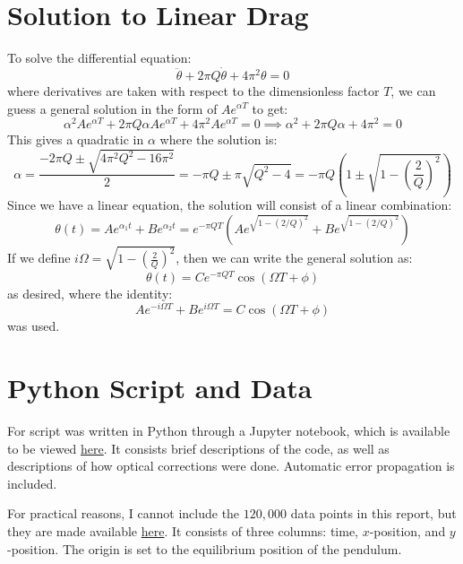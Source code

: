 \documentclass[%
 reprint,
 amsmath,amssymb
 aps,
]{revtex4-2}
\begin{document}
\section{Solution to Linear Drag}
\noindent To solve the differential equation:
\begin{equation}
    \ddot{\theta}+2\pi Q\dot{\theta}+4\pi^2\theta=0
    \label{eq:}
\end{equation}
where derivatives are taken with respect to the dimensionless factor $T$, we can guess a general solution in the form of $Ae^{\alpha T}$ to get:
\begin{equation}
    \alpha^2Ae^{\alpha T}+2\pi Q\alpha Ae^{\alpha T}+4\pi^2Ae^{\alpha T}=0 \implies \alpha^2+2\pi Q\alpha+4\pi^2 = 0
    \label{eq:}
\end{equation}
This gives a quadratic in $\alpha$ where the solution is:
\begin{equation}
    \alpha = \frac{-2\pi Q \pm \sqrt{4\pi^2Q^2-16\pi^2}}{2}= -\pi Q\pm \pi\sqrt{Q^2-4}=-\pi Q\left(1\pm\sqrt{1-\left(\frac{2}{Q}\right)^2}\right)
    \label{eq:}
\end{equation}
Since we have a linear equation, the solution will consist of a linear combination:
\begin{equation}
    \theta(t)=Ae^{\alpha_1t}+Be^{\alpha_2t}=e^{-\pi Q T}\left(Ae^{\sqrt{1-(2/Q)^2}}+Be^{\sqrt{1-(2/Q)^2}}\right)
    \label{eq:}
\end{equation}
If we define $i\Omega=\sqrt{1-\left(\frac{2}{Q}\right)^2}$, then we can write the general solution as:
\begin{equation}
    \theta(t)=Ce^{-\pi QT}\cos\left(\Omega T+\phi\right)
    \label{eq:}
\end{equation}
as desired, where the identity:
\begin{equation}
    Ae^{-i\Omega T}+Be^{i\Omega T}=C\cos\left(\Omega T+\phi\right)
    \label{eq:}
\end{equation}
was used.
\section{Python Script and Data}
For script was written in Python through a Jupyter notebook, which is available to be viewed \href{https://github.com/QiLinXue/pendulum-labs/blob/main/Data%20Analysis.ipynb}{here}. It consists brief descriptions of the code, as well as descriptions of how optical corrections were done. Automatic error propagation is included.

For practical reasons, I cannot include the $120,000$ data points in this report, but they are made available \href{https://github.com/QiLinXue/pendulum-labs/blob/main/data.txt}{here}. It consists of three columns: time, $x$-position, and $y$-position. The origin is set to the equilibrium position of the pendulum.
\end{document}
